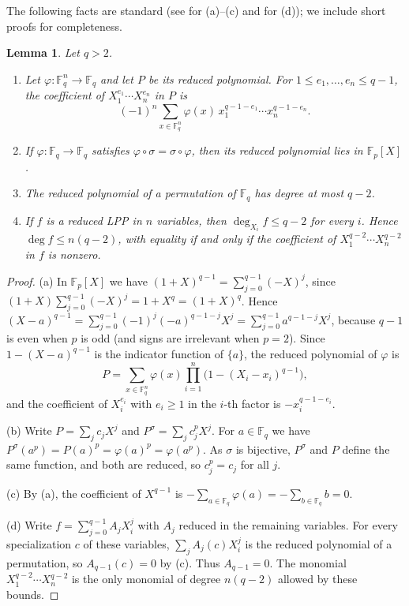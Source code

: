 \documentclass[11pt]{amsart}
\newtheorem{lemma}[theorem]{Lemma}
\theoremstyle{definition}
\theoremstyle{remark}
\newcommand{\F}{\mathbb{F}}
\begin{document}
The following facts are standard (see \cite{LN} for (a)--(c) and \cite[Proposition~1]{GU23} for (d)); we include short proofs for completeness.

\newpage

\begin{lemma}\label{lem:prelim}
Let $q>2$.
\begin{enumerate}
\item[(a)] Let $\varphi\colon\F_q^n\to\F_q$ and let $P$ be its reduced polynomial. For $1\le e_1,\dots,e_n\le q-1$, the coefficient of $X_1^{e_1}\cdots X_n^{e_n}$ in $P$ is
\[
(-1)^n\sum_{x\in\F_q^n}\varphi(x)\,x_1^{q-1-e_1}\cdots x_n^{q-1-e_n}.
\]
\item[(b)] If $\varphi\colon\F_q\to\F_q$ satisfies $\varphi\circ\sigma=\sigma\circ\varphi$, then its reduced polynomial lies in $\F_p[X]$.
\item[(c)] The reduced polynomial of a permutation of $\F_q$ has degree at most $q-2$.
\item[(d)] If $f$ is a reduced LPP in $n$ variables, then $\deg_{X_i}f\le q-2$ for every $i$. Hence $\deg f\le n(q-2)$, with equality if and only if the coefficient of $X_1^{q-2}\cdots X_n^{q-2}$ in $f$ is nonzero.
\end{enumerate}
\end{lemma}

\begin{proof}
(a) In $\F_p[X]$ we have $(1+X)^{q-1}=\sum_{j=0}^{q-1}(-X)^j$, since $(1+X)\sum_{j=0}^{q-1}(-X)^j=1+X^q=(1+X)^q$. Hence $(X-a)^{q-1}=\sum_{j=0}^{q-1}(-1)^j(-a)^{q-1-j}X^j=\sum_{j=0}^{q-1}a^{q-1-j}X^j$, because $q-1$ is even when $p$ is odd (and signs are irrelevant when $p=2$). Since $1-(X-a)^{q-1}$ is the indicator function of $\{a\}$, the reduced polynomial of $\varphi$ is
\[
P=\sum_{x\in\F_q^n}\varphi(x)\prod_{i=1}^n\bigl(1-(X_i-x_i)^{q-1}\bigr),
\]
and the coefficient of $X_i^{e_i}$ with $e_i\ge1$ in the $i$-th factor is $-x_i^{q-1-e_i}$.

(b) Write $P=\sum_j c_jX^j$ and $P^\sigma=\sum_j c_j^pX^j$. For $a\in\F_q$ we have $P^\sigma(a^p)=P(a)^p=\varphi(a)^p=\varphi(a^p)$. As $\sigma$ is bijective, $P^\sigma$ and $P$ define the same function, and both are reduced, so $c_j^p=c_j$ for all $j$.

(c) By (a), the coefficient of $X^{q-1}$ is $-\sum_{a\in\F_q}\varphi(a)=-\sum_{b\in\F_q}b=0$.

(d) Write $f=\sum_{j=0}^{q-1}A_jX_i^j$ with $A_j$ reduced in the remaining variables. For every specialization $c$ of these variables, $\sum_jA_j(c)X_i^j$ is the reduced polynomial of a permutation, so $A_{q-1}(c)=0$ by (c). Thus $A_{q-1}=0$. The monomial $X_1^{q-2}\cdots X_n^{q-2}$ is the only monomial of degree $n(q-2)$ allowed by these bounds.
\end{proof}
\end{document}
